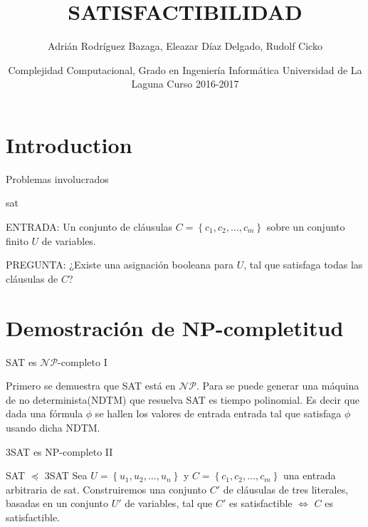 \documentclass[10pt, mathserif, profesionalfont]{beamer}
\title{SATISFACTIBILIDAD}
\author{Adrián Rodríguez Bazaga, Eleazar Díaz Delgado, Rudolf Cicko}
\institute[Universidad de La Laguna]{Adrián Rodríguez Bazaga, Eleazar Díaz Delgado \and Rudolf Cicko} %
\date{Complejidad Computacional, Grado en Ingeniería Informática \newline Universidad de La Laguna \newline Curso 2016-2017}
\begin{document}
\begin{frame}
  \titlepage
\end{frame}


\section{Introduction}


\begin{frame}{Problemas involucrados}

\begin{block}{\gls{sat}}
{\small
\noindent ENTRADA: Un conjunto de cláusulas $C=\left \{c_1, c_2, \dots, c_m \right \}$ sobre un conjunto finito $U$ de variables.

\noindent PREGUNTA: ¿Existe una asignación booleana para $U$, tal que satisfaga todas las cláusulas de $C$?
}
\end{block}

\end{frame}


\section{Demostración de NP-completitud}

\begin{frame}{SAT es $\mathcal{NP}$-completo I}

  \begin{block}
    Primero se demuestra que SAT está en $\mathcal{NP}$. Para se puede generar
    una máquina de no determinista(NDTM) que resuelva SAT es tiempo polinomial. Es
    decir que dada una fórmula $\phi$ se hallen los valores de entrada entrada
    tal que satisfaga $\phi$ usando dicha NDTM.
  \end{block}

\end{frame}

\begin{frame}{3SAT es NP-completo II}

\begin{block}{SAT $\preceq$ 3SAT}
Sea $U=\left \{u_1, u_2, \dots, u_n  \right\}$  y $C=\left \{c_1, c_2, \dots, c_m \right \}$ una entrada arbitraria de \gls{sat}. Construiremos una conjunto $C'$ de cláusulas de tres literales, basadas en un conjunto $U'$ de variables, tal que $C'$ es satisfactible $\Leftrightarrow$ $C$ es satisfactible.
\end{block}

\end{frame}
\end{document}
